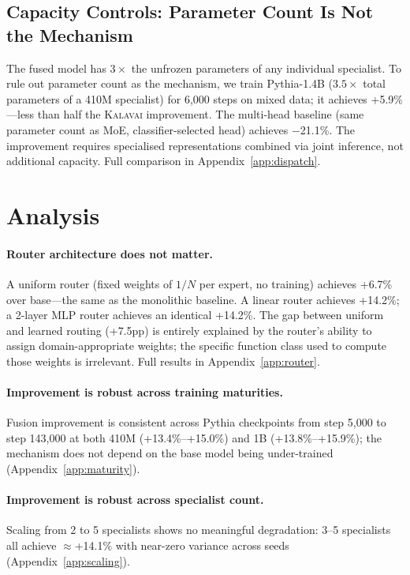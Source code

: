 \documentclass{article}
\newcommand{\kalavai}{\textsc{Kalavai}\xspace}
\begin{document}
\subsection{Capacity Controls: Parameter Count Is Not the Mechanism}
\label{sec:capacity}

The fused model has $3\times$ the unfrozen parameters of any individual specialist. To rule out parameter count as the mechanism, we train Pythia-1.4B ($3.5\times$ total parameters of a 410M specialist) for 6,000 steps on mixed data; it achieves +5.9\%---less than half the \kalavai improvement. The multi-head baseline (same parameter count as MoE, classifier-selected head) achieves $-$21.1\%. The improvement requires specialised representations combined via joint inference, not additional capacity. Full comparison in Appendix~\ref{app:dispatch}.

\section{Analysis}
\label{sec:analysis}

\paragraph{Router architecture does not matter.} A uniform router (fixed weights of $1/N$ per expert, no training) achieves +6.7\% over base---the same as the monolithic baseline. A linear router achieves +14.2\%; a 2-layer MLP router achieves an identical +14.2\%. The gap between uniform and learned routing (+7.5pp) is entirely explained by the router's ability to assign domain-appropriate weights; the specific function class used to compute those weights is irrelevant. Full results in Appendix~\ref{app:router}.

\paragraph{Improvement is robust across training maturities.} Fusion improvement is consistent across Pythia checkpoints from step 5,000 to step 143,000 at both 410M (+13.4\%--+15.0\%) and 1B (+13.8\%--+15.9\%); the mechanism does not depend on the base model being under-trained (Appendix~\ref{app:maturity}).

\paragraph{Improvement is robust across specialist count.} Scaling from 2 to 5 specialists shows no meaningful degradation: 3--5 specialists all achieve $\approx$+14.1\% with near-zero variance across seeds (Appendix~\ref{app:scaling}).
\end{document}
